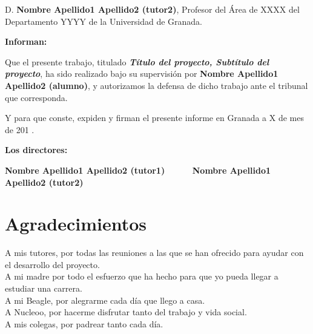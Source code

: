 D. \textbf{Nombre Apellido1 Apellido2 (tutor2)}, Profesor del Área de XXXX del Departamento YYYY de la Universidad de Granada.


\vspace{0.5cm}

\textbf{Informan:}

\vspace{0.5cm}

Que el presente trabajo, titulado \textit{\textbf{Título del proyecto, Subtítulo del proyecto}},
ha sido realizado bajo su supervisión por \textbf{Nombre Apellido1 Apellido2 (alumno)}, y autorizamos la defensa de dicho trabajo ante el tribunal
que corresponda.

\vspace{0.5cm}

Y para que conste, expiden y firman el presente informe en Granada a X de mes de 201 .

\vspace{1cm}

\textbf{Los directores:}

\vspace{5cm}

\noindent \textbf{Nombre Apellido1 Apellido2 (tutor1) \ \ \ \ \ Nombre Apellido1 Apellido2 (tutor2)}

\chapter*{Agradecimientos}
\thispagestyle{empty}

       \vspace{1cm}
       
       A mis tutores, por todas las reuniones a las que se han ofrecido para ayudar con el desarrollo del proyecto. \\
       
       A mi madre por todo el esfuerzo que ha hecho para que yo pueda llegar a estudiar una carrera. \\
       
       A mi Beagle, por alegrarme cada día que llego a casa. \\
       
       A Nucleoo, por hacerme disfrutar tanto del trabajo y vida social. \\
       
       A mis colegas, por padrear tanto cada día. \\
      
